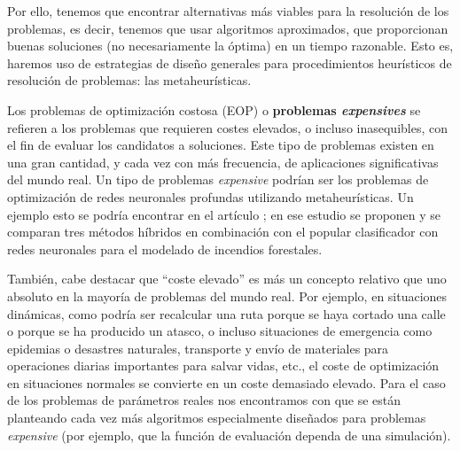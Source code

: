 Por ello, tenemos que encontrar alternativas más viables para la resolución de los problemas, es decir, tenemos que usar algoritmos aproximados, que proporcionan buenas soluciones (no necesariamente la óptima) en un tiempo razonable. 
Esto es, haremos uso de estrategias de diseño generales para procedimientos heurísticos de resolución de problemas: las metaheurísticas.

Los problemas de optimización costosa (EOP) o \textbf{problemas \textit{expensives}} se refieren a los problemas que requieren costes elevados, o incluso inasequibles, con el fin de evaluar los candidatos a soluciones. 
Este tipo de problemas existen en una gran cantidad, y cada vez con más frecuencia, de aplicaciones significativas del mundo real. 
Un tipo de problemas \textit{expensive} podrían ser los problemas de optimización de redes neuronales profundas utilizando metaheurísticas. 
Un ejemplo esto se podría encontrar en el artículo \parencite{buiMetaheuristicAlgorithmsOptimizing2019}; en ese estudio se proponen y se comparan tres métodos híbridos en combinación con el popular clasificador con redes neuronales para el modelado de incendios forestales.

También, cabe destacar que ``coste elevado'' es más un concepto relativo que uno absoluto en la mayoría de problemas del mundo real. 
Por ejemplo, en situaciones dinámicas, como podría ser recalcular una ruta porque se haya cortado una calle o porque se ha producido un atasco, o incluso situaciones de emergencia como epidemias o desastres naturales, transporte y envío de materiales para operaciones diarias importantes para salvar vidas, etc., el coste de optimización en situaciones normales se convierte en un coste demasiado elevado. 
Para el caso de los problemas de parámetros reales nos encontramos con que se están planteando cada vez más algoritmos especialmente diseñados para problemas \textit{expensive} (por ejemplo, que la función de evaluación dependa de una simulación).

